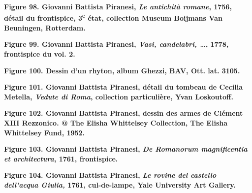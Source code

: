 \documentclass[12pt,twoside,openany]{book}
\begin{document}
\begin{center}
\par\small \textbf{Figure 98. Giovanni Battista Piranesi, \textit{Le antichità romane}, 1756, détail du frontispice, 3\textsuperscript{e} état, collection Museum Boijmans Van Beuningen, Rotterdam.}
\end{center}

\begin{center}
\par\small \textbf{Figure 99. Giovanni Battista Piranesi, \textit{Vasi, candelabri, …}, 1778, frontispice du vol. 2.}
\end{center}

\begin{center}
\par\small \textbf{Figure 100. Dessin d’un rhyton, album Ghezzi, BAV, Ott. lat. 3105.}
\end{center}

\begin{center}
\par\small \textbf{Figure 101. Giovanni Battista Piranesi, détail du tombeau de Cecilia Metella, \textit{Vedute di Roma}, collection particulière, Yvan Loskoutoff.}
\end{center}

\begin{center}
\par\small \textbf{Figure 102. Giovanni Battista Piranesi, dessin des armes de Clément XIII Rezzonico. @ The Elisha Whittelsey Collection, The Elisha Whittelsey Fund, 1952.}
\end{center}

\begin{center}
\par\small \textbf{Figure 103. Giovanni Battista Piranesi, \textit{De Romanorum magnificentia et architectura}, 1761, frontispice.}
\end{center}

\begin{center}
\par\small \textbf{Figure 104. Giovanni Battista Piranesi, \textit{Le rovine del castello dell’acqua Giulia, }1761, cul-de-lampe, Yale University Art Gallery.}
\end{center}
\end{document}
